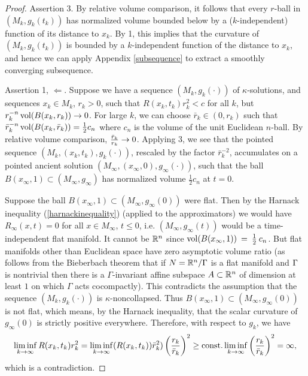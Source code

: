 \begin{proof}
\bigskip
Assertion 3.  By relative volume comparison, it follows that  every
$r$-ball in $(M_k,g_k(t_k))$ has normalized volume bounded below
by a ($k$-independent) function of its distance to $x_k$.
By 1, this implies that  the curvature of $(M_k,g_k(t_k))$ is bounded
by a $k$-independent function of the distance to $x_k$,
and hence we can apply Appendix \ref{subsequence} to extract
a smoothly converging subsequence.

\bigskip
Assertion 1, $\Longleftarrow$.  Suppose we have a sequence
$(M_k,g_k(\cdot))$ of $\kappa$-solutions, and sequences
$x_k\in M_k$, $r_k>0$, such that $R(x_k,t_k)r_k^2<c$ for all
$k$, but $r_k^{-n}\operatorname{vol}(B(x_k,r_k))\rightarrow 0$.
For large $k$, we can choose $\bar r_k \in (0, r_k)$ such that
$\bar r_k^{-n}\operatorname{vol}(B(x_k,\bar r_k))=\frac{1}{2}c_n$
where $c_n$ is the volume of the unit Euclidean $n$-ball.
By relative volume comparison, $\frac{\bar r_k}{r_k}\rightarrow 0$.
Applying 3, we see that the pointed sequence $(M_k,(x_k,t_k),g_k(\cdot))$,
rescaled by the factor $\bar r_k^{-2}$, accumulates
on a pointed ancient solution $(M_\infty,(x_\infty,0),g_\infty(\cdot))$,
such that the ball $B(x_\infty,1)\subset (M_\infty,g_\infty)$ has
normalized volume $\frac{1}{2}c_n$ at $t=0$.

Suppose the ball $B(x_\infty,1)\subset (M_\infty,g_\infty(0))$ were flat.
Then by the Harnack inequality (\ref{harnackinequality}) (applied to the approximators)
we would have $R_\infty(x,t)=0$ for all $x\in M_\infty$, $t\leq 0$,
i.e. $(M_\infty,g_\infty(t))$ would be a time-independent flat manifold.
It cannot be ${\mathbb R}^n$ since $\operatorname{vol}(B(x_\infty,1)) \: = \: \frac12 \: c_n$.
But flat manifolds other than Euclidean space have zero asymptotic volume ratio
(as follows from the Bieberbach theorem that if $N={\mathbb R}^n/\Gamma$ is
a flat manifold and $\Gamma$ is nontrivial then there is a $\Gamma$-invariant
affine subspace $A\subset {\mathbb R}^n$ of dimension at least $1$
on which $\Gamma$ acts cocompactly).
This contradicts the assumption that the sequence $(M_k,g_k(\cdot))$
is $\kappa$-noncollapsed.  Thus
$B(x_\infty,1)\subset (M_\infty,g_\infty(0))$ is not flat, which means,
by the Harnack inequality, that the
scalar curvature of $g_\infty(0)$ is strictly positive
everywhere.  Therefore, with respect to $g_k$, we have
\begin{equation}
\liminf_{k\rightarrow \infty}R(x_k,t_k)r_k^2=
\liminf_{k\rightarrow\infty}(R(x_k,t_k))\bar
r_k^2)\left(\frac{r_k}{\bar r_k}\right)^2
\geq \operatorname{const.}
\liminf_{k\rightarrow\infty}\left(\frac{r_k}{\bar r_k}\right)^2=\infty,
\end{equation}
which is a contradiction.


\end{proof}
